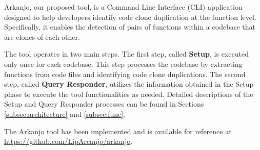 \en

Arkanjo, our proposed tool, is a Command Line Interface (CLI) application designed to
help developers identify code clone duplication at the function level.
Specifically, it enables the detection of pairs of functions within a codebase
that are clones of each other.

The tool operates in two main steps. The first step, called \textbf{Setup}, is
executed only once for each codebase. This step processes the codebase by
extracting functions from code files and identifying code clone duplications.
The second step, called \textbf{Query Responder}, utilizes the information obtained in
the Setup phase to execute the tool functionalities as needed. Detailed
descriptions of the Setup and Query Responder processes can be found in
Sections \ref{subsec:architecture} and \ref{subsec:func}.

The Arkanjo tool has been implemented and is available for reference at
\url{https://github.com/LipArcanjo/arkanjo}.

